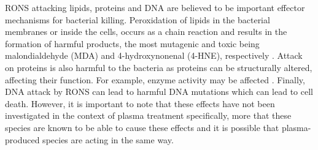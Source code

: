 \documentclass[11pt, oneside]{article}   	%
\newcommand{\todo}[1]{ \textcolor{red}{\bf{To Do:} #1}}
\begin{document}
RONS attacking lipids, proteins and DNA are believed to be important effector mechanisms for bacterial killing.
Peroxidation of lipids in the bacterial membranes or inside the cells, occurs as a chain reaction and results in the formation of harmful products, the most mutagenic and toxic being malondialdehyde (MDA) and 4-hydroxynonenal (4-HNE), respectively \cite{Ayala2014lipid}.
Attack on proteins is also harmful to the bacteria as proteins can be structurally altered, affecting their function.
For example, enzyme activity may be affected \cite{PhamHuy2008free}.
Finally, DNA attack by RONS can lead to harmful DNA mutations which can lead to cell death.
However, it is important to note that these effects have not been investigated in the context of plasma treatment specifically, more that these species are known to be able to cause these effects and it is possible that plasma-produced species are acting in the same way.

%
%
\end{document}
